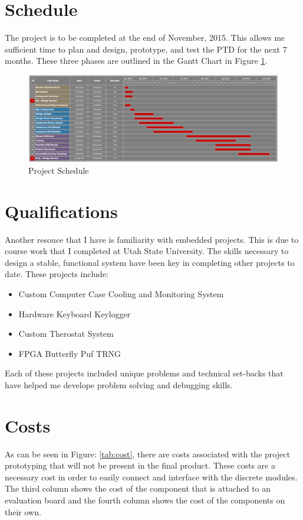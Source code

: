 \documentclass[11pt]{article}
\begin{document}
\section{Schedule}
The project is to be completed at the end of November, 2015. This allows me sufficient time to plan and design, prototype, and test the PTD for the next 7 
months. These three phases are outlined in the Gantt Chart in Figure \ref{fig:gantt_schedule}.
\begin{figure}[H]
   \centering
       \includegraphics[scale=0.4]{senior_project_gantt.png}
   \caption{Project Schedule}
   \label{fig:gantt_schedule}
\end{figure}

\section{Qualifications}
Another resouce that I have is familiarity with embedded projects. This is due to course work that I completed at Utah State University. The skills 
necessary to design a stable, functional system have been key in completing other projects to date. These projects include:
\begin{itemize}
    \item Custom Computer Case Cooling and Monitoring System
    \item Hardware Keyboard Keylogger
    \item Custom Therostat System
    \item FPGA Butterfly Puf TRNG
\end{itemize}
Each of these projects included unique problems and technical set-backs that have helped me develope problem solving and debugging skills.


\section{Costs}
As can be seen in Figure: \ref{tab:cost}, there are costs associated with the project prototyping that will not be present in the final product.
These costs are a necessary cost in order to easily connect and interface with the discrete modules. The third column shows the cost of the 
component that is attached to an evaluation board and the fourth column shows the cost of the components on their own.
\end{document}
